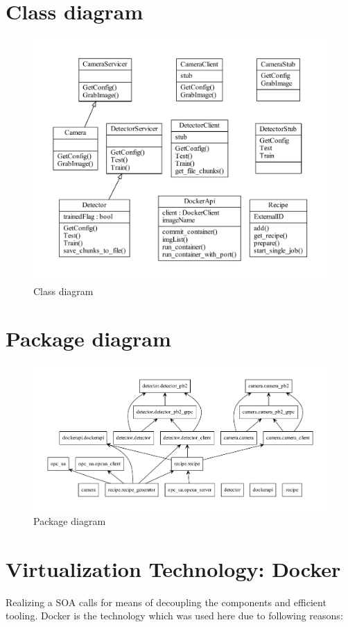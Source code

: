 \section{Class diagram}
\begin{figure}[ht]
	\centering
  \includegraphics[width=\textwidth]{img/classes.pdf}
	\caption{Class diagram}
	\label{fig:Classes}
\end{figure}

\section{Package diagram}
\begin{figure}[ht]
	\centering
  \includegraphics[width=\textwidth]{img/packages.pdf}
	\caption{Package diagram}
	\label{fig:Packages}
\end{figure}

\section{Virtualization Technology: Docker}
Realizing a SOA calls for means of decoupling the components and efficient tooling. Docker is the technology which was used here due to following reasons:
